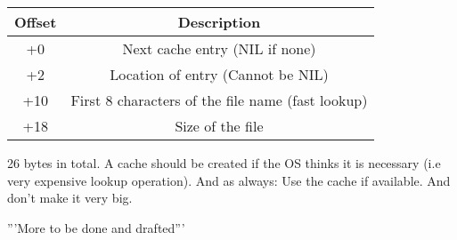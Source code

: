 \documentclass[12pt]{article}
\begin{document}
\begin{center}
\begin{tabular}{ |c|c| }
\hline
Offset & Description \\
\hline
+0 & Next cache entry (NIL if none) \\
+2 & Location of entry (Cannot be NIL) \\
+10 & First 8 characters of the file name (fast lookup) \\
+18 & Size of the file \\
\hline
\end{tabular}
\end{center}

26 bytes in total. A cache should be created if the OS thinks it is necessary (i.e very expensive lookup operation). And as always: Use the cache if available. And don't make it very big.

'''More to be done and drafted'''
\end{document}
